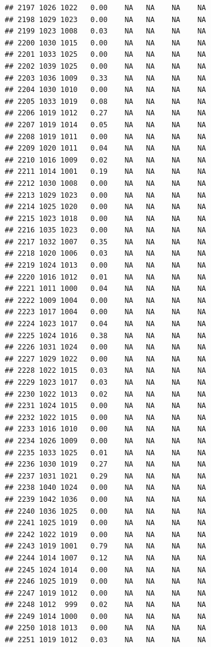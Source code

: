 \documentclass{article}\usepackage{graphicx, color}
\makeatletter
\newenvironment{kframe}{%
 \def\at@end@of@kframe{}%
 \ifinner\ifhmode%
  \def\at@end@of@kframe{\end{minipage}}%
  \begin{minipage}{\columnwidth}%
 \fi\fi%
 \def\FrameCommand##1{\hskip\@totalleftmargin \hskip-\fboxsep
 \colorbox{shadecolor}{##1}\hskip-\fboxsep
     \hskip-\linewidth \hskip-\@totalleftmargin \hskip\columnwidth}%
 \MakeFramed {\advance\hsize-\width
   \@totalleftmargin\z@ \linewidth\hsize
   \@setminipage}}%
 {\par\unskip\endMakeFramed%
 \at@end@of@kframe}
\newenvironment{knitrout}{}{} %
\makeatother
\begin{document}
\begin{knitrout}
\begin{kframe}
\begin{verbatim}
## 2197 1026 1022   0.00    NA   NA    NA    NA
## 2198 1029 1023   0.00    NA   NA    NA    NA
## 2199 1023 1008   0.03    NA   NA    NA    NA
## 2200 1030 1015   0.00    NA   NA    NA    NA
## 2201 1033 1025   0.00    NA   NA    NA    NA
## 2202 1039 1025   0.00    NA   NA    NA    NA
## 2203 1036 1009   0.33    NA   NA    NA    NA
## 2204 1030 1010   0.00    NA   NA    NA    NA
## 2205 1033 1019   0.08    NA   NA    NA    NA
## 2206 1019 1012   0.27    NA   NA    NA    NA
## 2207 1019 1014   0.05    NA   NA    NA    NA
## 2208 1019 1011   0.00    NA   NA    NA    NA
## 2209 1020 1011   0.04    NA   NA    NA    NA
## 2210 1016 1009   0.02    NA   NA    NA    NA
## 2211 1014 1001   0.19    NA   NA    NA    NA
## 2212 1030 1008   0.00    NA   NA    NA    NA
## 2213 1029 1023   0.00    NA   NA    NA    NA
## 2214 1025 1020   0.00    NA   NA    NA    NA
## 2215 1023 1018   0.00    NA   NA    NA    NA
## 2216 1035 1023   0.00    NA   NA    NA    NA
## 2217 1032 1007   0.35    NA   NA    NA    NA
## 2218 1020 1006   0.03    NA   NA    NA    NA
## 2219 1024 1013   0.00    NA   NA    NA    NA
## 2220 1016 1012   0.01    NA   NA    NA    NA
## 2221 1011 1000   0.04    NA   NA    NA    NA
## 2222 1009 1004   0.00    NA   NA    NA    NA
## 2223 1017 1004   0.00    NA   NA    NA    NA
## 2224 1023 1017   0.04    NA   NA    NA    NA
## 2225 1024 1016   0.38    NA   NA    NA    NA
## 2226 1031 1024   0.00    NA   NA    NA    NA
## 2227 1029 1022   0.00    NA   NA    NA    NA
## 2228 1022 1015   0.03    NA   NA    NA    NA
## 2229 1023 1017   0.03    NA   NA    NA    NA
## 2230 1022 1013   0.02    NA   NA    NA    NA
## 2231 1024 1015   0.00    NA   NA    NA    NA
## 2232 1022 1015   0.00    NA   NA    NA    NA
## 2233 1016 1010   0.00    NA   NA    NA    NA
## 2234 1026 1009   0.00    NA   NA    NA    NA
## 2235 1033 1025   0.01    NA   NA    NA    NA
## 2236 1030 1019   0.27    NA   NA    NA    NA
## 2237 1031 1021   0.29    NA   NA    NA    NA
## 2238 1040 1024   0.00    NA   NA    NA    NA
## 2239 1042 1036   0.00    NA   NA    NA    NA
## 2240 1036 1025   0.00    NA   NA    NA    NA
## 2241 1025 1019   0.00    NA   NA    NA    NA
## 2242 1022 1019   0.00    NA   NA    NA    NA
## 2243 1019 1001   0.79    NA   NA    NA    NA
## 2244 1014 1007   0.12    NA   NA    NA    NA
## 2245 1024 1014   0.00    NA   NA    NA    NA
## 2246 1025 1019   0.00    NA   NA    NA    NA
## 2247 1019 1012   0.00    NA   NA    NA    NA
## 2248 1012  999   0.02    NA   NA    NA    NA
## 2249 1014 1000   0.00    NA   NA    NA    NA
## 2250 1018 1013   0.00    NA   NA    NA    NA
## 2251 1019 1012   0.03    NA   NA    NA    NA

\end{verbatim}
\end{kframe}
\end{knitrout}
\end{document}
